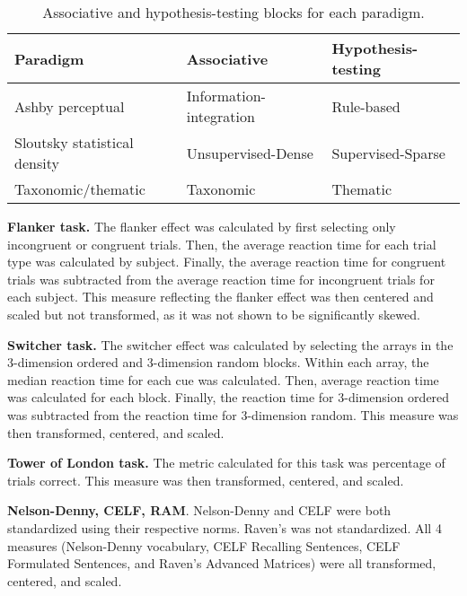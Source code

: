 \documentclass[../dissertation.tex]{subfiles}
\begin{document}
\begin{table}[H]
\caption{Associative and hypothesis-testing blocks for each paradigm.}
\vspace{-10pt}
\begin{center}
\begin{tabularx}{\textwidth}{>{\centering\arraybackslash}p{5cm}YY}
 \toprule
Paradigm                     & Associative             & Hypothesis-testing \\
\midrule
Ashby perceptual             & Information-integration & Rule-based         \\
Sloutsky statistical density & Unsupervised-Dense      & Supervised-Sparse  \\
Taxonomic/thematic           & Taxonomic               & Thematic  \\
 \bottomrule 
\end{tabularx}
\label{exp2systems}
\end{center}
\end{table}
	
	\textbf{Flanker task.} The flanker effect was calculated by first selecting only incongruent or congruent trials. Then, the average reaction time for each trial type was calculated by subject. Finally, the average reaction time for congruent trials was subtracted from the average reaction time for incongruent trials for each subject. This measure reflecting the flanker effect was then centered and scaled but not transformed, as it was not shown to be significantly skewed. \par
	\textbf{Switcher task.} The switcher effect was calculated by selecting the arrays in the 3-dimension ordered and 3-dimension random blocks. Within each array, the median reaction time for each cue was calculated. Then, average reaction time was calculated for each block. Finally, the reaction time for 3-dimension ordered was subtracted from the reaction time for 3-dimension random. This measure was then transformed, centered, and scaled. \par 
	\textbf{Tower of London task.} The metric calculated for this task was percentage of trials correct. This measure was then transformed, centered, and scaled. \par 
	\textbf{Nelson-Denny, CELF, RAM}. Nelson-Denny and CELF were both standardized using their respective norms. Raven's was not standardized. All 4 measures (Nelson-Denny vocabulary, CELF Recalling Sentences, CELF Formulated Sentences, and Raven's Advanced Matrices) were all transformed, centered, and scaled.
	
\end{document}
